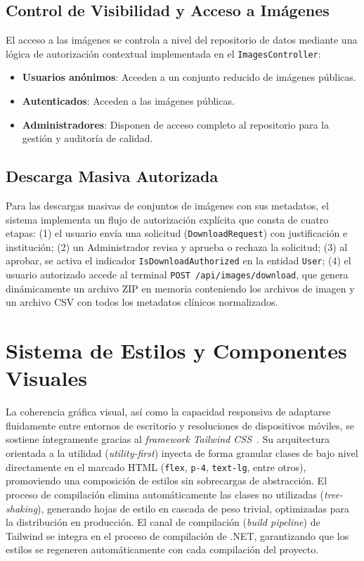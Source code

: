 \subsection{Control de Visibilidad y Acceso a Imágenes}
El acceso a las imágenes se controla a nivel del repositorio de datos mediante una lógica de autorización 
contextual implementada en el \texttt{ImagesController}:

\begin{itemize}
    \item \textbf{Usuarios anónimos}: Acceden a un conjunto reducido de imágenes públicas.
    \item \textbf{Autenticados}: Acceden a las imágenes públicas.
    \item \textbf{Administradores}: Disponen de acceso completo al repositorio para la gestión y auditoría de calidad.
\end{itemize}

\subsection{Descarga Masiva Autorizada}
Para las descargas masivas de conjuntos de imágenes con sus metadatos, el sistema implementa un flujo 
de autorización explícita que consta de cuatro etapas: (1) el usuario envía una solicitud 
(\texttt{DownloadRequest}) con justificación e institución; (2) un Administrador revisa y aprueba o 
rechaza la solicitud; (3) al aprobar, se activa el indicador \texttt{IsDownloadAuthorized} en la 
entidad \texttt{User}; (4) el usuario autorizado accede al terminal \texttt{POST /api/images/download}, 
que genera dinámicamente un archivo ZIP en memoria conteniendo los archivos de imagen y un archivo CSV 
con todos los metadatos clínicos normalizados.

\section{Sistema de Estilos y Componentes Visuales}
La coherencia gráfica visual, así como la capacidad responsiva de adaptarse fluidamente entre entornos 
de escritorio y resoluciones de dispositivos móviles, se sostiene íntegramente gracias al 
\textit{framework} \textit{Tailwind CSS}~\cite{tailwindcss_docs}. Su arquitectura orientada a la 
utilidad (\textit{utility-first}) inyecta de forma granular clases de bajo nivel directamente en el 
marcado HTML (\texttt{flex}, \texttt{p-4}, \texttt{text-lg}, entre otros), promoviendo una composición 
de estilos sin sobrecargas de abstracción. El proceso de compilación elimina automáticamente las clases 
no utilizadas (\textit{tree-shaking}), generando hojas de estilo en cascada de peso trivial, optimizadas 
para la distribución en producción. El canal de compilación (\textit{build pipeline}) de Tailwind se 
integra en el proceso de compilación de .NET, garantizando que los estilos se regeneren automáticamente 
con cada compilación del proyecto.

